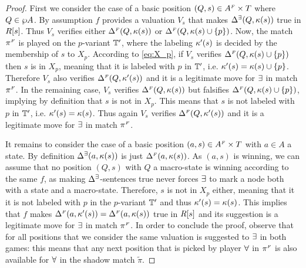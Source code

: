 \begin{proof}
First we consider the case of a basic position $(Q,s) \in A^{{\scriptscriptstyle F}} \times T$ 
where $Q \in \wp A$. 
By assumption $f$ provides a valuation $V_s$ that makes $\Delta^\exists(Q,\kappa(s))$ true
in $R[s]$. 
Thus $V_s$ verifies either $\Delta^{{\scriptscriptstyle F}}(Q,\kappa(s))$ or $\Delta^{{\scriptscriptstyle F}}(Q,\kappa(s)\cup 
\{p\})$. 
Now, the match $\pi^{{\scriptscriptstyle F}}$ is played on the $p$-variant $\mathbb{T}'$, where the 
labeling $\kappa'(s)$ is decided by the membership of $s$ to $X_p$. 
According to \eqref{eq:X_p}, if $V_s$ verifies 
$\Delta^{{\scriptscriptstyle F}}(Q,\kappa(s)\cup \{p\})$ then $s$ is in $X_p$, meaning that it is
labeled with $p$ in $\mathbb{T}'$, i.e. $\kappa'(s) = \kappa(s)\cup \{p\}$. 
Therefore $V_s$ also verifies $\Delta^{{\scriptscriptstyle F}}(Q,\kappa'(s))$ and it is a 
legitimate move for $\exists$ in match $\pi^{{\scriptscriptstyle F}}$. 
In the remaining case, $V_s$ verifies $\Delta^{{\scriptscriptstyle F}}(Q,\kappa(s))$ but 
falsifies $\Delta^{{\scriptscriptstyle F}}(Q,\kappa(s)\cup \{p\})$, implying by definition that $s$ 
is not in $X_p$. 
This means that $s$ is not labeled with $p$ in $\mathbb{T}'$, i.e. $\kappa'(s) = \kappa(s)$.
Thus again $V_s$ verifies $\Delta^{{\scriptscriptstyle F}}(Q,\kappa'(s))$ and it is a 
legitimate move for $\exists$ in match $\pi^{{\scriptscriptstyle F}}$.

It remains to consider the case of a basic position $(a,s) \in A^{{\scriptscriptstyle F}} \times T$
with $a \in A$ a state. 
By definition $\Delta^\exists(a,\kappa(s))$ is just $\Delta^{{\scriptscriptstyle F}}(a,\kappa(s))$. 
As $(a,s)$ is winning, we can assume that no position $(Q,s)$ with $Q$ a 
macro-state is winning according to the same $f$, as making $\Delta^\exists$-sentences
true never forces $\exists$ to mark a node both with a state and a macro-state. 
Therefore, $s$ is not in $X_p$ either, meaning that it it is not labeled with 
$p$ in the $p$-variant $\mathbb{T}'$ and thus $\kappa'(s) = \kappa(s)$. 
This implies that $f$ makes $\Delta^{{\scriptscriptstyle F}}(a,\kappa'(s)) = \Delta^{{\scriptscriptstyle F}}(a,\kappa(s))$
true in $R[s]$ and its suggestion is a legitimate move for $\exists$ in match
$\pi^{{\scriptscriptstyle F}}$.
In order to conclude the proof, observe that for all positions that we consider
the same valuation is suggested to $\exists$ in both games: this means that any 
next position that is picked by player $\forall$ in $\pi^{{\scriptscriptstyle F}}$ is also 
available for $\forall$ in the shadow match $\tilde{\pi}$.
\medskip


\end{proof}
